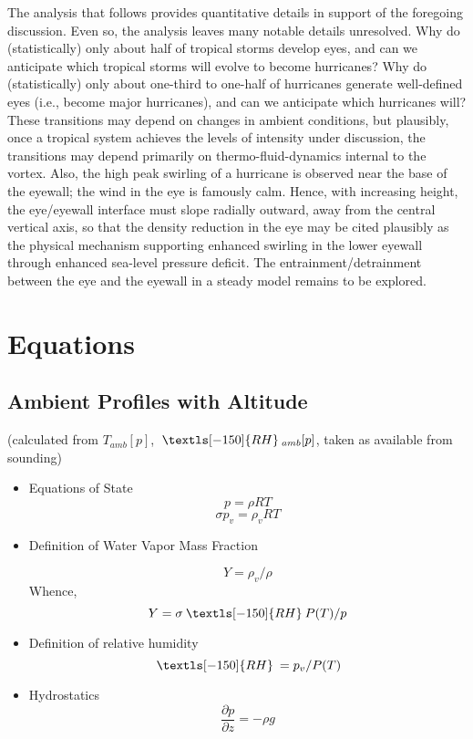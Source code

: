 \documentclass[preprint, prX]{revtex4}
\newcommand{\pd}[2]{\frac{\partial#1}{\partial#2}}
\newcommand{\rh}{\:\textls[-150]{RH}\:}
\begin{document}
The analysis that follows provides quantitative details in support of the foregoing discussion. Even so, the analysis leaves many notable details unresolved. Why do (statistically) only about half of tropical storms develop eyes, and can we anticipate which tropical storms will evolve to become hurricanes? Why do (statistically) only about one-third to one-half of hurricanes generate well-defined eyes (i.e., become major hurricanes), and can we anticipate which hurricanes will? These transitions may depend on changes in ambient conditions, but plausibly, once a tropical system achieves the levels of intensity under discussion, the transitions may depend primarily on thermo-fluid-dynamics internal to the vortex. Also, the high peak swirling of a hurricane is observed near the base of the eyewall; the wind in the eye is famously calm. Hence, with increasing height, the eye/eyewall interface must slope radially outward, away from the central vertical axis, so that the density reduction in the eye may be cited plausibly as the physical mechanism supporting enhanced swirling in the lower eyewall through enhanced sea-level pressure deficit. The entrainment/detrainment between the eye and the eyewall in a steady model remains to be explored.

\section{Equations}

\subsection{Ambient Profiles with Altitude  }
(calculated from $T_{amb}[p]$, $ \rh_{amb}[p]$, taken as available from sounding)
\begin{itemize}

\item Equations of State
\begin{equation}
	p = \rho R T
\end{equation}
\begin{equation}
	\sigma p_v = \rho_v R T
\end{equation}

\item Definition of Water Vapor Mass Fraction

\begin{equation}
	Y = \rho_v / \rho
\end{equation}
Whence,
\begin{equation}
	Y = \sigma \rh P(T) / p
\end{equation}

\item Definition of relative humidity
\begin{equation}
	\rh = p_v / P(T)
\end{equation}

\item Hydrostatics
\begin{equation}
	\pd{p}{z} = -\rho g
\end{equation}

\end{itemize}
\end{document}
